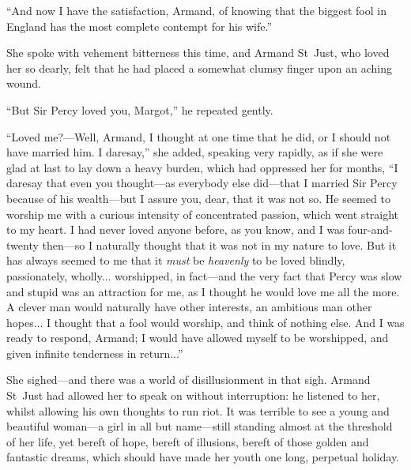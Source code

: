 \enquote{And now I have the satisfaction, Armand, of knowing that the biggest fool in England has the most complete contempt for his wife.}

She spoke with vehement bitterness this time, and Armand St~Just, who loved her so dearly, felt that he had placed a somewhat clumsy finger upon an aching wound.

\enquote{But Sir Percy loved you, Margot,} he repeated gently.

\enquote{Loved me?---Well, Armand, I thought at one time that he did, or I should not have married him. I daresay,} she added, speaking very rapidly, as if she were glad at last to lay down a heavy burden, which had oppressed her for months, \enquote{I daresay that even you thought---as everybody else did---that I married Sir Percy because of his wealth---but I assure you, dear, that it was not so. He seemed to worship me with a curious intensity of concentrated passion, which went straight to my heart. I had never loved anyone before, as you know, and I was four-and-twenty then---so I naturally thought that it was not in my nature to love. But it has always seemed to me that it \textit{must} be \textit{heavenly} to be loved blindly, passionately, wholly... worshipped, in fact---and the very fact that Percy was slow and stupid was an attraction for me, as I thought he would love me all the more. A clever man would naturally have other interests, an ambitious man other hopes... I thought that a fool would worship, and think of nothing else. And I was ready to respond, Armand; I would have allowed myself to be worshipped, and given infinite tenderness in return...}

She sighed---and there was a world of disillusionment in that sigh. Armand St~Just had allowed her to speak on without interruption: he listened to her, whilst allowing his own thoughts to run riot. It was terrible to see a young and beautiful woman---a girl in all but name---still standing almost at the threshold of her life, yet bereft of hope, bereft of illusions, bereft of those golden and fantastic dreams, which should have made her youth one long, perpetual holiday.

